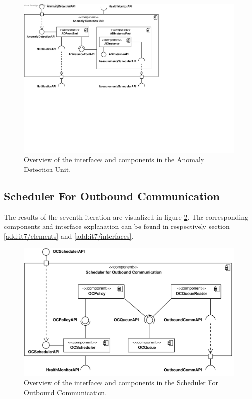 \begin{figure}
	\begin{centering}
		\includegraphics[width=\textwidth]{figs/add-it6-interfaces.pdf}
		\caption{Overview of the interfaces and components in the Anomaly Detection
		Unit.}
		\label{fig:final-architecture/it6}
	\end{centering}
\end{figure}

\subsection{Scheduler For Outbound Communication}

\npar The results of the seventh iteration are visualized in figure
\ref{fig:final-architecture/it7}. The corresponding components and interface
explanation can be found in respectively section \ref{add:it7/elements} and
\ref{add:it7/interfaces}.

\begin{figure}
	\begin{centering}
		\includegraphics[width=\textwidth]{figs/add-it7-interfaces.pdf}
		\caption{Overview of the interfaces and components in the Scheduler For
		Outbound Communication.}
		\label{fig:final-architecture/it7}
	\end{centering}
\end{figure}

